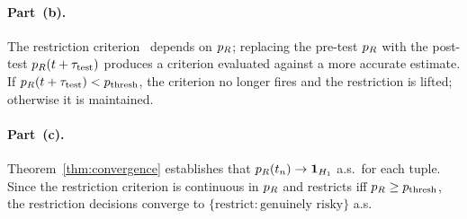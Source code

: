 \paragraph{Part~(b).}
The restriction
criterion~\citep[Proposition~1]{lasser2026horizon} depends on
$p_R$; replacing the pre-test $p_R$ with the post-test
$p_R(t + \tau_{\mathrm{test}})$ produces a criterion evaluated against a
more accurate estimate.  If $p_R(t + \tau_{\mathrm{test}}) <
p_{\mathrm{thresh}}$, the criterion no longer fires and the
restriction is lifted; otherwise it is maintained.

\paragraph{Part~(c).}
Theorem~\ref{thm:convergence} establishes that $p_R(t_n) \to
\mathbf{1}_{H_1}$ a.s.\ for each tuple.  Since the restriction
criterion is continuous in $p_R$ and restricts iff $p_R \geq
p_{\mathrm{thresh}}$, the restriction decisions converge to
$\{\text{restrict} : \text{genuinely risky}\}$ a.s.
